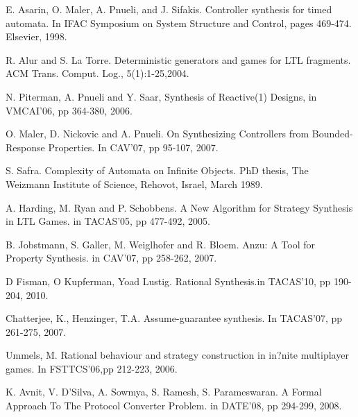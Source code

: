 \documentclass[journal]{IEEEtran}
\begin{document}
\begin{thebibliography}{1}
E. Asarin, O. Maler, A. Pnueli, and J. Sifakis.
Controller synthesis for timed automata.
In IFAC Symposium on System Structure and Control, pages 469-474. Elsevier, 1998.

R. Alur and S. La Torre.
Deterministic generators and games for LTL fragments.
ACM Trans. Comput. Log., 5(1):1-25,2004.

N. Piterman, A. Pnueli and Y. Saar,
Synthesis of Reactive(1) Designs,
in VMCAI'06,
pp 364-380,
2006.

O. Maler, D. Nickovic and A. Pnueli.
On Synthesizing Controllers from Bounded-Response Properties.
In CAV'07,
pp 95-107,
2007.

S. Safra.
Complexity of Automata on Infinite Objects.
PhD thesis, The Weizmann Institute of Science, Rehovot, Israel, March 1989.

A. Harding, M. Ryan and P. Schobbens.
A New Algorithm for Strategy Synthesis in LTL Games.
in TACAS'05,
pp 477-492,
2005.

B. Jobstmann, S. Galler, M. Weiglhofer and R. Bloem.
Anzu: A Tool for Property Synthesis.
in CAV'07,
pp 258-262,
2007.



D Fisman, O Kupferman, Yoad Lustig. Rational Synthesis.in TACAS'10, pp 190-204, 2010.

Chatterjee, K., Henzinger, T.A. Assume-guarantee synthesis. In TACAS'07, pp 261-275, 2007.

Ummels, M. Rational behaviour and strategy construction in in?nite multiplayer games. In FSTTCS'06,pp 212-223, 2006.

K. Avnit, V. D'Silva, A. Sowmya, S. Ramesh, S. Parameswaran.
A Formal Approach To The Protocol Converter Problem.
in DATE'08,
pp 294-299,
2008.




\end{thebibliography}
\end{document}
